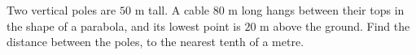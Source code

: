 Two vertical poles are $50$ m tall. A cable $80$ m long hangs between their tops in the shape of a parabola, and its lowest point is $20$ m above the ground. Find the distance between the poles, to the nearest tenth of a metre.
